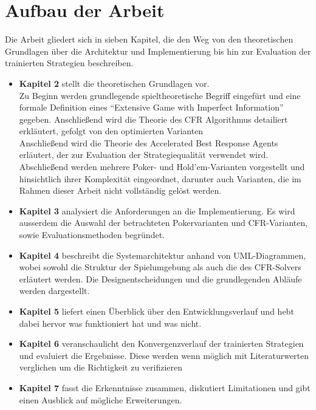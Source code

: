 \section{Aufbau der Arbeit}
Die Arbeit gliedert sich in sieben Kapitel, die den Weg von den theoretischen Grundlagen über die Architektur und Implementierung bis hin zur Evaluation der trainierten Strategien beschreiben.

\begin{itemize}
\item \textbf{Kapitel 2} stellt die theoretischen Grundlagen vor.\\
Zu Beginn werden grundlegende spieltheoretische Begriff eingefürt und eine formale Definition eines \enquote{Extensive Game with Imperfect Information} gegeben.
Anschließend wird die Theorie des CFR Algorithmus detailiert erkläutert, gefolgt von den optimierten Varianten\\
Anschließend wird die Theorie des Accelerated Best Response Agents erläutert, der zur Evaluation der Strategiequalität verwendet wird.
Abschließend werden mehrere Poker- und Hold'em-Varianten vorgestellt und hinsichtlich ihrer Komplexität eingeordnet, darunter auch Varianten, die im Rahmen dieser Arbeit nicht vollständig gelöst werden.

\item \textbf{Kapitel 3} analysiert die Anforderungen an die Implementierung.
Es wird ausserdem die Auswahl der betrachteten Pokervarianten und CFR-Varianten, sowie Evaluationsmethoden begründet.

\item \textbf{Kapitel 4} beschreibt die Systemarchitektur anhand von UML-Diagrammen, wobei sowohl die Struktur der Spielumgebung als auch die des CFR-Solvers erläutert werden.
Die Designentscheidungen und die grundlegenden Abläufe werden dargestellt.

\item \textbf{Kapitel 5} liefert einen Überblick über den Entwicklungsverlauf und hebt dabei hervor was funktioniert hat und was nicht.


\item \textbf{Kapitel 6} veranschaulicht den Konvergenzverlauf der trainierten Strategien und evaluiert die Ergebnisse.
Diese werden wenn möglich mit Literaturwerten verglichen um die Richtigkeit zu verifizieren

\item \textbf{Kapitel 7} fasst die Erkenntnisse zusammen, diskutiert Limitationen und gibt einen Ausblick auf mögliche Erweiterungen.
\end{itemize}